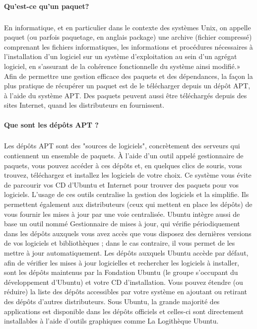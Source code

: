\documentclass[a4paper,12pt]{article}
\begin{document}
\paragraph{Qu'est-ce qu'un paquet?}
\subparagraph{}
En informatique, et en particulier dans le contexte des systèmes Unix, on appelle paquet (ou parfois paquetage, en anglais package) une archive (fichier compressé) comprenant les fichiers informatiques, 
les informations et procédures nécessaires à l'installation d'un logiciel sur un système d'exploitation au sein d'un agrégat logiciel, en s'assurant de la cohérence fonctionnelle du système ainsi modifié.» 	
Afin de permettre une gestion efficace des paquets et des dépendances, la façon la plus pratique de récupérer un paquet est de le télécharger depuis un dépôt APT, à l'aide du système APT. Des paquets 
peuvent aussi être téléchargés depuis des sites Internet, quand les distributeurs en fournissent.

\paragraph{Que sont les dépôts APT ?}
\subparagraph{}
Les dépôts APT sont des "sources de logiciels", concrètement des serveurs qui contiennent un ensemble de paquets. À l'aide d'un outil appelé gestionnaire de paquets, vous pouvez accéder à ces dépôts et, 
en quelques clics de souris, vous trouvez, téléchargez et installez les logiciels de votre choix.
Ce système vous évite de parcourir vos CD d'Ubuntu et Internet pour trouver des paquets pour vos logiciels.
L'usage de ces outils centralise la gestion des logiciels et la simplifie. Ils permettent également aux distributeurs (ceux qui mettent en place les dépôts) de vous fournir les mises à jour par une voie centralisée.
Ubuntu intègre aussi de base un outil nommé Gestionnaire de mises à jour, qui vérifie périodiquement dans les dépôts auxquels vous avez accès que vous disposez des dernières versions de vos logiciels et bibliothèques ;
dans le cas contraire, il vous permet de les mettre à jour automatiquement.
Les dépôts auxquels Ubuntu accède par défaut, afin de vérifier les mises à jour logicielles et rechercher les logiciels à installer, sont les dépôts maintenus par la Fondation Ubuntu 
(le groupe s'occupant du développement d'Ubuntu) et votre CD d'installation. Vous pouvez étendre (ou réduire) la liste des dépôts accessibles par votre système en ajoutant ou retirant des dépôts d'autres distributeurs. 
Sous Ubuntu, la grande majorité des applications est disponible dans les dépôts officiels et celles-ci sont directement installables à l'aide d'outils graphiques comme La Logithèque Ubuntu.
\end{document}
